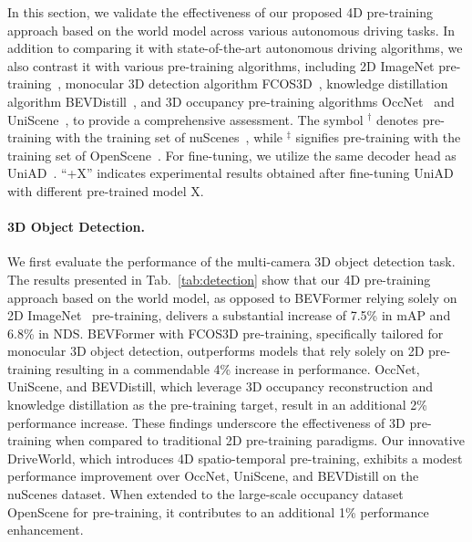In this section, we validate the effectiveness of our proposed 4D pre-training approach based on the world model across various autonomous driving tasks. In addition to comparing it with state-of-the-art autonomous driving algorithms, we also contrast it with various pre-training algorithms, including 2D ImageNet pre-training~\cite{resnet}, monocular 3D detection algorithm FCOS3D~\cite{fcos3d}, knowledge distillation algorithm BEVDistill~\cite{bevdistill}, and 3D occupancy pre-training algorithms OccNet~\cite{occnet} and UniScene~\cite{uniscene}, to provide a comprehensive assessment. The symbol $^{\dagger}$ denotes pre-training with the training set of nuScenes~\cite{nuscenes}, while $^{\ddagger}$ signifies pre-training with the training set of OpenScene~\cite{openscene}. For fine-tuning, we utilize the same decoder head as UniAD~\cite{uniad}. ``+X'' indicates experimental results obtained after fine-tuning UniAD with different pre-trained model X.

\paragraph{3D Object Detection.}

We first evaluate the performance of the multi-camera 3D object detection task. The results presented in Tab.~\ref{tab:detection} show that our 4D pre-training approach based on the world model, as opposed to BEVFormer relying solely on 2D ImageNet~\cite{resnet} pre-training, delivers a substantial increase of 7.5\% in mAP and 6.8\% in NDS. BEVFormer with FCOS3D pre-training, specifically tailored for monocular 3D object detection, outperforms models that rely solely on 2D pre-training resulting in a commendable 4\% increase in performance. OccNet, UniScene, and BEVDistill, which leverage 3D occupancy reconstruction and knowledge distillation as the pre-training target, result in an additional 2\% performance increase.
These findings underscore the effectiveness of 3D pre-training when compared to traditional 2D pre-training paradigms. Our innovative DriveWorld, which introduces 4D spatio-temporal pre-training, exhibits a modest performance improvement over OccNet, UniScene, and BEVDistill on the nuScenes dataset. When extended to the large-scale occupancy dataset OpenScene for pre-training, it contributes to an additional 1\% performance enhancement. 
